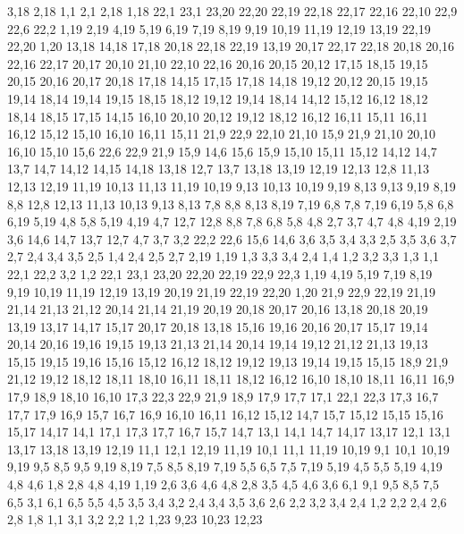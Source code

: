 3,18
2,18
%
1,1
2,1
2,18
1,18
22,1
23,1
23,20
22,20
22,19
22,18
22,17
22,16
22,10
22,9
22,6
22,2
%
1,19
2,19
4,19
5,19
6,19
7,19
8,19
9,19
10,19
11,19
12,19
13,19
22,19
22,20
1,20
%
13,18
14,18
17,18
20,18
22,18
22,19
13,19
%
20,17
22,17
22,18
20,18
%
20,16
22,16
22,17
20,17
%
20,10
21,10
22,10
22,16
20,16
20,15
20,12
%
17,15
18,15
19,15
20,15
20,16
20,17
20,18
17,18
%
14,15
17,15
17,18
14,18
%
19,12
20,12
20,15
19,15
19,14
%
18,14
19,14
19,15
18,15
%
18,12
19,12
19,14
18,14
%
14,12
15,12
16,12
18,12
18,14
18,15
17,15
14,15
%
16,10
20,10
20,12
19,12
18,12
16,12
16,11
%
15,11
16,11
16,12
15,12
%
15,10
16,10
16,11
15,11
%
21,9
22,9
22,10
21,10
%
15,9
21,9
21,10
20,10
16,10
15,10
%
15,6
22,6
22,9
21,9
15,9
%
14,6
15,6
15,9
15,10
15,11
15,12
14,12
14,7
%
13,7
14,7
14,12
14,15
14,18
13,18
%
12,7
13,7
13,18
13,19
12,19
12,13
12,8
%
11,13
12,13
12,19
11,19
%
10,13
11,13
11,19
10,19
%
9,13
10,13
10,19
9,19
%
8,13
9,13
9,19
8,19
%
8,8
12,8
12,13
11,13
10,13
9,13
8,13
%
7,8
8,8
8,13
8,19
7,19
%
6,8
7,8
7,19
6,19
%
5,8
6,8
6,19
5,19
%
4,8
5,8
5,19
4,19
%
4,7
12,7
12,8
8,8
7,8
6,8
5,8
4,8
%
2,7
3,7
4,7
4,8
4,19
2,19
%
3,6
14,6
14,7
13,7
12,7
4,7
3,7
%
3,2
22,2
22,6
15,6
14,6
3,6
3,5
3,4
3,3
%
2,5
3,5
3,6
3,7
2,7
%
2,4
3,4
3,5
2,5
%
1,4
2,4
2,5
2,7
2,19
1,19
%
1,3
3,3
3,4
2,4
1,4
%
1,2
3,2
3,3
1,3
%
1,1
22,1
22,2
3,2
1,2
22,1
23,1
23,20
22,20
22,19
22,9
22,3
%
1,19
4,19
5,19
7,19
8,19
9,19
10,19
11,19
12,19
13,19
20,19
21,19
22,19
22,20
1,20
%
21,9
22,9
22,19
21,19
21,14
21,13
21,12
%
20,14
21,14
21,19
20,19
20,18
20,17
20,16
%
13,18
20,18
20,19
13,19
%
13,17
14,17
15,17
20,17
20,18
13,18
%
15,16
19,16
20,16
20,17
15,17
%
19,14
20,14
20,16
19,16
19,15
%
19,13
21,13
21,14
20,14
19,14
%
19,12
21,12
21,13
19,13
%
15,15
19,15
19,16
15,16
%
15,12
16,12
18,12
19,12
19,13
19,14
19,15
15,15
%
18,9
21,9
21,12
19,12
18,12
18,11
18,10
%
16,11
18,11
18,12
16,12
%
16,10
18,10
18,11
16,11
%
16,9
17,9
18,9
18,10
16,10
%
17,3
22,3
22,9
21,9
18,9
17,9
17,7
%
17,1
22,1
22,3
17,3
%
16,7
17,7
17,9
16,9
%
15,7
16,7
16,9
16,10
16,11
16,12
15,12
%
14,7
15,7
15,12
15,15
15,16
15,17
14,17
%
14,1
17,1
17,3
17,7
16,7
15,7
14,7
%
13,1
14,1
14,7
14,17
13,17
%
12,1
13,1
13,17
13,18
13,19
12,19
%
11,1
12,1
12,19
11,19
%
10,1
11,1
11,19
10,19
%
9,1
10,1
10,19
9,19
9,5
%
8,5
9,5
9,19
8,19
%
7,5
8,5
8,19
7,19
%
5,5
6,5
7,5
7,19
5,19
%
4,5
5,5
5,19
4,19
4,8
4,6
%
1,8
2,8
4,8
4,19
1,19
%
2,6
3,6
4,6
4,8
2,8
%
3,5
4,5
4,6
3,6
%
6,1
9,1
9,5
8,5
7,5
6,5
%
3,1
6,1
6,5
5,5
4,5
3,5
3,4
3,2
%
2,4
3,4
3,5
3,6
2,6
%
2,2
3,2
3,4
2,4
%
1,2
2,2
2,4
2,6
2,8
1,8
%
1,1
3,1
3,2
2,2
1,2
1,23
9,23
10,23
12,23
